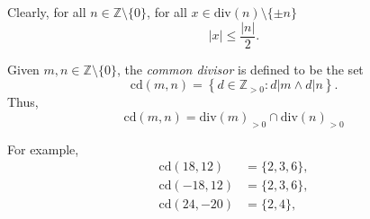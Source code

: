 Clearly, for all $n \in \mathbb Z \setminus \{0\}$, for all $x \in \mathrm{div}(n) \setminus \{\pm n\}$
$$
|x| \le \frac{|n|}{2}.
$$

\begin{definition}
	Given $m, n \in \mathbb Z \setminus \{0\}$, the \textit{common divisor} is defined to be the set
	$$
	\mathrm{cd}(m,n) = \left\{ d \in \mathbb Z_{> 0} : d|m \land d|n \right\}.
	$$
	Thus,
	$$
	\mathrm{cd}(m,n) = \mathrm{div}(m)_{> 0} \cap \mathrm{div}(n)_{>0}
	$$
\end{definition}


For example,
$$
\begin{aligned}
	\mathrm{cd}(18, 12) &= \{ 2, 3, 6 \}, \\
	\mathrm{cd}(-18, 12) &= \{ 2, 3, 6 \}, \\
	\mathrm{cd}(24, -20) &= \{ 2, 4 \},
\end{aligned}
$$


























%